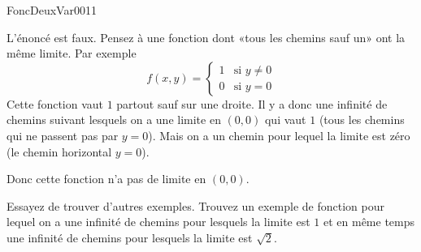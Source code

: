 

\begin{corrige}{FoncDeuxVar0011}

	L'énoncé est faux. Pensez à une fonction dont «tous les chemins sauf un» ont la même limite. Par exemple
	\begin{equation}
		f(x,y)=\begin{cases}
			1	&	\text{si }y\neq 0\\
			0	&	 \text{si }y=0
		\end{cases}
	\end{equation}
	Cette fonction vaut $1$ partout sauf sur une droite. Il y a donc une infinité de chemins suivant lesquels on a une limite en $(0,0)$ qui vaut $1$ (tous les chemins qui ne passent pas par $y=0$). Mais on a un chemin pour lequel la limite est zéro (le chemin horizontal $y=0$).

	Donc cette fonction n'a pas de limite en $(0,0)$.

	Essayez de trouver d'autres exemples. Trouvez un exemple de fonction pour lequel on a une infinité de chemins pour lesquels la limite est $1$ et en même temps une infinité de chemins pour lesquels la limite est $\sqrt{2}$.

\end{corrige}
